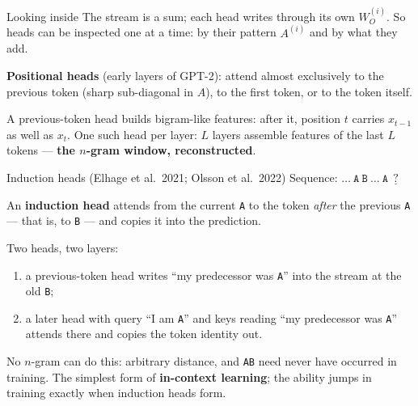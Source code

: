 \documentclass[11pt,aspectratio=169]{beamer}
\newcommand{\dest}[1]{\textcolor{structure}{\textbf{#1}}}
\begin{document}
\begin{frame}{Looking inside}
  The stream is a sum; each head writes through its own $W_O^{(i)}$. So heads can be
  inspected one at a time: by their pattern $A^{(i)}$ and by what they add.

  \vspace{1em}
  \textbf{Positional heads} (early layers of GPT-2): attend almost exclusively to the
  previous token (sharp sub-diagonal in $A$), to the first token, or to the token itself.

  \vspace{0.6em}
  A previous-token head builds bigram-like features: after it, position $t$ carries
  $x_{t-1}$ as well as $x_t$. One such head per layer: $L$ layers assemble features of the
  last $L$ tokens --- \dest{the $n$-gram window, reconstructed}.
\end{frame}

\begin{frame}{Induction heads (Elhage et al.\ 2021; Olsson et al.\ 2022)}
  Sequence: \quad $\dots\ \texttt{A}\ \texttt{B}\ \dots\ \texttt{A}\ \underline{\ ?\ }$

  \vspace{0.6em}
  An \dest{induction head} attends from the current \texttt{A} to the token \emph{after}
  the previous \texttt{A} --- that is, to \texttt{B} --- and copies it into the prediction.

  \vspace{0.8em}
  Two heads, two layers:
  \begin{enumerate}
    \item a previous-token head writes ``my predecessor was \texttt{A}'' into the stream at
          the old \texttt{B};
    \item a later head with query ``I am \texttt{A}'' and keys reading ``my predecessor was
          \texttt{A}'' attends there and copies the token identity out.
  \end{enumerate}

  \vspace{0.6em}
  No $n$-gram can do this: arbitrary distance, and \texttt{AB} need never have occurred in
  training. The simplest form of \dest{in-context learning}; the ability jumps in training
  exactly when induction heads form.
\end{frame}
\end{document}
